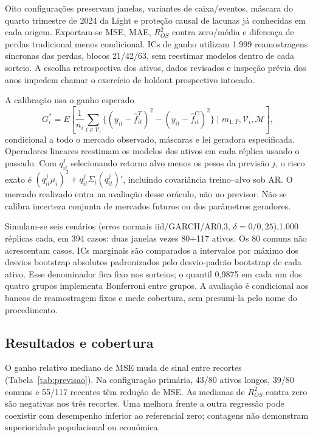 Oito configurações preservam janelas, variantes de caixa/eventos,
máscara do quarto trimestre de 2024 da Light e proteção causal de lacunas já conhecidas em cada
origem. Exportam-se MSE, MAE, $R^2_{OS}$ contra zero/média e diferença
de perdas tradicional menos condicional. ICs de ganho utilizam 1.999
reamostragens síncronas das perdas, blocos 21/42/63, sem reestimar
modelos dentro de cada sorteio. A escolha retrospectiva dos ativos,
dados revisados e inspeção prévia dos anos impedem chamar o exercício
de holdout prospectivo intocado.

A calibração usa o ganho esperado
\begin{equation}
G_i^*=E\!\left[\frac{1}{n_i}\sum_{t\in\mathcal V_i}
 \{(y_{it}-\widehat f^T_{it})^2-(y_{it}-\widehat f^C_{it})^2\}
 \mid m_{1:T},\mathcal V_i,\mathcal M\right],
\end{equation}
condicional a todo o mercado observado, máscaras e lei geradora
especificada. Operadores lineares reestimam os modelos dos ativos
em cada réplica usando o passado. Com $q^j_{it}$ selecionando retorno
alvo menos os pesos da previsão $j $, o risco exato é
$(q^j_{it}\mu_i)^2+q^j_{it}\Sigma_i(q^j_{it})'$, incluindo
covariância treino--alvo sob AR. O mercado realizado entra na avaliação
desse oráculo, não no previsor. Não se calibra incerteza conjunta de
mercados futuros ou dos parâmetros geradores.

Simulam-se seis cenários (erros normais iid/GARCH/AR0,3,
$\delta=0/0,25$),1.000 réplicas cada, em 394 casos: duas janelas
vezes 80+117 ativos. Os 80 comuns não acrescentam casos.
ICs marginais são comparados a intervalos por máximo dos desvios
bootstrap absolutos padronizados pelo desvio-padrão bootstrap de cada
ativo. Esse denominador fica fixo nos sorteios; o quantil 0,9875
em cada um dos quatro grupos implementa Bonferroni entre grupos.
A avaliação é condicional aos bancos de reamostragem fixos e mede
cobertura, sem presumi-la pelo nome do procedimento.

\subsection{Resultados e cobertura}
O ganho relativo mediano de MSE muda de sinal entre recortes
(Tabela~\ref{tab:previsao}). Na configuração primária, 43/80 ativos
longos, 39/80 comuns e 55/117 recentes têm redução de MSE.
As medianas de $R^2_{OS}$ contra zero são negativas nos três recortes.
Uma melhora frente a outra regressão pode coexistir com desempenho
inferior ao referencial zero; contagens não demonstram superioridade
populacional ou econômica.

